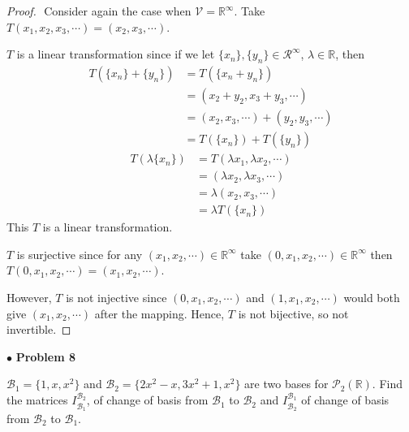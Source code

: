 \documentclass{article}
\begin{document}
\begin{proof}
$ $\newline
Consider again the case when $\mathcal{V} = \mathbb{R}^\infty$. Take $T(x_1, x_2, x_3, \cdots) = (x_2, x_3, \cdots)$.
\medskip

$T$ is a linear transformation since if we let $\{x_n\}, \{y_n \} \in \mathcal{R}^\infty$, $\lambda \in \mathbb{R}$, then
\begin{align*}
T(\{x_n\} + \{y_n\}) &= T( \{x_n +y_n \}) \\
&= (x_2+y_2, x_3+y_3, \cdots) \\
&= (x_2, x_3, \cdots) +(y_2, y_3, \cdots) \\
&= T(\{x_n\}) + T(\{y_n\})
\end{align*}
\begin{align*}
T(\lambda\{x_n\}) &= T(\lambda x_1, \lambda x_2, \cdots) \\
&= (\lambda x_2, \lambda x_3, \cdots) \\
&= \lambda (x_2, x_3, \cdots) \\
&= \lambda T(\{x_n\})
\end{align*}
This $T$ is a linear transformation.
\medskip

$T$ is surjective since for any $(x_1, x_2, \cdots ) \in \mathbb{R}^\infty$ take $(0, x_1, x_2, \cdots ) \in \mathbb{R}^\infty$ then $T(0, x_1, x_2, \cdots) = (x_1, x_2, \cdots )$. 

However, $T$ is not injective since $(0, x_1, x_2, \cdots)$ and $(1, x_1, x_2, \cdots)$ would both give $(x_1, x_2, \cdots )$ after the mapping. Hence, $T$ is not bijective, so not invertible.
\end{proof}

\newpage
$ \bullet$ \textbf{Problem 8}
\medskip

\begin{itshape}
$\mathcal{B}_1 = \{ 1, x ,x^2 \}$ and $\mathcal{B}_2 = \{ 2x^2-x, 3x^2+1, x^2 \}$ are two bases for $\mathcal{P}_2(\mathbb{R})$. Find the matrices $I_{\mathcal{B}_1}^{\mathcal{B}_2}$, of change of basis from $\mathcal{B}_1$ to $\mathcal{B}_2$ and $I_{\mathcal{B}_2}^{\mathcal{B}_1}$ of change of basis from $\mathcal{B}_2$ to $\mathcal{B}_1$.
\end{itshape}
\medskip
\end{document}
